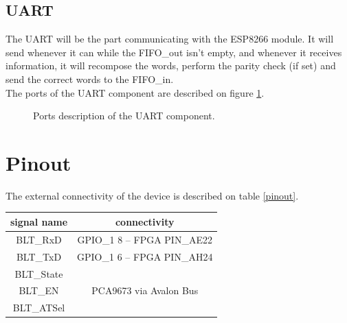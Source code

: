 \documentclass[11pt]{article}
\begin{document}
\subsection{UART}
The UART will be the part communicating with the ESP8266 module. It will send whenever it can while the FIFO\_out isn't empty, and whenever it receives information, it will recompose the words, perform the parity check (if set) and send the correct words to the FIFO\_in.
\\
The ports of the UART component are described on figure \ref{uart_ports}.
\begin{figure}[H]
        \caption{Ports description of the UART component.}
        \label{uart_ports}
\end{figure}

\section{Pinout}
The external connectivity of the device is described on table \ref{pinout}.
\begin{center}
\label{pinout}
\begin{tabular}{|c|c|}
\hline
signal name & connectivity\\
\hline
BLT\_RxD & GPIO\_1 8 -- FPGA PIN\_AE22\\
\hline
BLT\_TxD & GPIO\_1 6 -- FPGA PIN\_AH24\\
\hline
BLT\_State & \multirow{3}{*}{PCA9673 via Avalon Bus}\\
\cline{1-1}
BLT\_EN &\\
\cline{1-1}
BLT\_ATSel &\\
\hline
\end{tabular}
\end{center}
\end{document}
